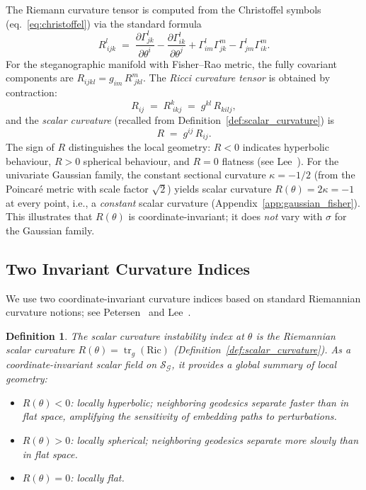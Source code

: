 \documentclass[a4paper,fleqn]{cas-dc}
\newtheorem{definition}{Definition}
\DeclareMathOperator{\tr}{tr}
\newcommand{\calS}{\mathcal{S}}
\newcommand{\calG}{\mathcal{G}}
\begin{document}
The Riemann curvature tensor is computed from the
Christoffel symbols (eq.~\eqref{eq:christoffel}) via the standard formula
\begin{equation}
  R^l_{\,ijk} \;=\; \frac{\partial\Gamma^l_{jk}}{\partial\theta^i}
  - \frac{\partial\Gamma^l_{ik}}{\partial\theta^j}
  + \Gamma^l_{im}\Gamma^m_{jk} - \Gamma^l_{jm}\Gamma^m_{ik}.
  \label{eq:riemann_coords}
\end{equation}
For the steganographic manifold with Fisher--Rao metric, the fully
covariant components are $R_{ijkl} = g_{im}\,R^m_{\;jkl}$.
The \emph{Ricci curvature tensor} is obtained by contraction:
\begin{equation}
  R_{ij} \;=\; R^k_{\;ikj} \;=\; g^{kl}\,R_{kilj},
  \label{eq:ricci_tensor}
\end{equation}
and the \emph{scalar curvature} (recalled from
Definition~\ref{def:scalar_curvature}) is
\begin{equation}
  R \;=\; g^{ij}\,R_{ij}.
  \label{eq:scalar_curvature_sec8}
\end{equation}
The sign of $R$ distinguishes the local geometry:
$R<0$ indicates hyperbolic behaviour, $R>0$ spherical behaviour, and
$R=0$ flatness (see Lee~\cite{lee2006riemannian}).
For the univariate Gaussian family, the constant sectional curvature
$\kappa = -1/2$ (from the Poincar\'e metric with scale factor $\sqrt{2}$)
yields scalar curvature $R(\theta) = 2\kappa = -1$ at every point,
i.e., a \emph{constant} scalar curvature
(Appendix~\ref{app:gaussian_fisher}).
This illustrates that $R(\theta)$ is coordinate-invariant; it does
\emph{not} vary with $\sigma$ for the Gaussian family.

\subsection{Two Invariant Curvature Indices}

We use two coordinate-invariant curvature indices based on standard
Riemannian curvature notions; see Petersen~\cite{petersen2016riemannian}
and Lee~\cite{lee2006riemannian}. 

\begin{definition}%
  \label{def:scalar_instability}
  The \emph{scalar curvature instability index} at $\theta$ is the
  Riemannian scalar curvature $R(\theta) = \tr_g(\mathrm{Ric})$
  (Definition~\ref{def:scalar_curvature}).
  As a coordinate-invariant scalar field on $\calS_{\calG}$, it provides
  a global summary of local geometry:
  \begin{itemize}
    \item $R(\theta) < 0$: locally hyperbolic; neighboring geodesics separate
          faster than in flat space, amplifying the sensitivity of embedding
          paths to perturbations.
    \item $R(\theta) > 0$: locally spherical; neighboring geodesics separate
          more slowly than in flat space.
    \item $R(\theta) = 0$: locally flat.
  \end{itemize}
\end{definition}
\end{document}
